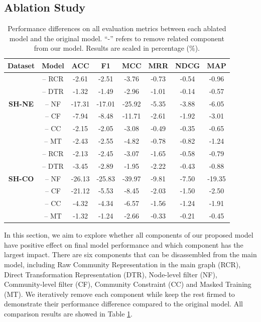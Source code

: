 \subsection{Ablation Study}
\begin{table}[h]
	
	\centering
	\begin{tabular}{cccccccc} 
		\toprule
		\textbf{Dataset}& \textbf{Model}	
		& \textbf{ACC}& \textbf{F1}& \textbf{MCC}& \textbf{MRR} & \textbf{NDCG}& \textbf{MAP}\\ \midrule 
		\multirow{5}{*}{ \textbf{SH-NE}} & -- RCR  &-2.61&-2.51&-3.76&-0.73&-0.54&-0.96\\
		& -- DTR &-1.32&-1.49&-2.96&-1.01&-0.14&-0.57\\ 
		& -- NF &-17.31&-17.01	&-25.92&-5.35&-3.88&-6.05\\
		& -- CF &-7.94&-8.48&-11.71&-2.61&-1.92&-3.01\\
		& -- CC &-2.15&-2.05&-3.08&-0.49&-0.35&-0.65\\ 
		& -- MT &-2.43&-2.55&-4.82&-0.78&-0.82&-1.24\\ 
		\midrule 
		\multirow{5}{*}{ \textbf{SH-CO}} & -- RCR &-2.13&-2.45&-3.07&-1.65&-0.58&-0.79  \\  
		& -- DTR &-3.45&-2.89&-1.95&-2.22&-0.43&-0.88\\ 
		& -- NF &-26.13&-25.83&-39.97&-9.81&-7.50&-19.35\\ 
		& -- CF &-21.12&-5.53&-8.45&-2.03&-1.50&-2.50\\
		& -- CC &-4.32&-4.34&-6.57&-1.56&-1.24&-1.91\\
		& -- MT &-1.32&-1.24&-2.66&-0.33&-0.21&-0.45\\ \bottomrule
	\end{tabular}
	\caption{Performance differences on all evaluation metrics between each ablated model and the original model. ``-'' refers to remove related component from our model. Results are scaled in percentage (\%).}
	\label{tab:c4_ablation}
\end{table} 
In this section, we aim to explore whether all components of our proposed model have positive effect on final model performance and which component has the largest impact. There are six components that can be disassembled from the main model, including Raw Community Representation in the main graph (RCR), Direct Transformation Representation (DTR), Node-level filter (NF), Community-level filter (CF), Community Constraint (CC) and Masked Training (MT). We iteratively remove each component while keep the rest firmed to demonstrate their performance difference compared to the original model. All comparison results are showed in Table \ref{tab:c4_ablation}.


